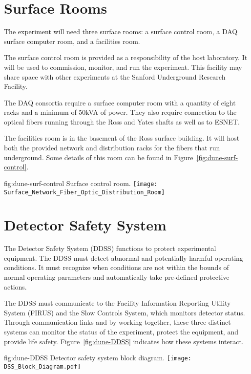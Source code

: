 \section{Surface Rooms}
\label{sec:fdsp-coord-surf-rooms}


The  experiment will need three surface rooms: a surface
control room, a DAQ surface computer room, and a facilities room.


The  surface control room is provided as a responsibility of the host laboratory.  It will be used to commission, monitor, and run the
experiment.  This facility may share space with
other experiments at the Sanford Underground Research
Facility.


The DAQ consortia require a surface computer room with a
quantity of eight racks and a minimum of 50kVA of power.  They also require connection
to the optical fibers running through the Ross and Yates shafts as
well as to ESNET.


The facilities room is in the basement of the Ross surface
building.  It will host both the \fnal provided network and
distribution racks for the fibers that run underground. Some details
of this room can be found in Figure~\ref{fig:dune-surf-control}.
\begin{dunefigure}{fig:dune-surf-control}
  {Surface control room.}
  \texttt{[image: Surface\_Network\_Fiber\_Optic\_Distribution\_Room]}
\end{dunefigure}


\section{ Detector Safety System}
\label{sec:fdsp-coord-det-safety}


The  Detector Safety System (DDSS) functions to protect
experimental equipment.  The DDSS must detect abnormal and
potentially harmful operating conditions.  It must recognize when
conditions are not within the bounds of normal operating parameters
and automatically take pre-defined protective actions.


The DDSS must communicate to the \surf Facility Information
Reporting Utility System (FIRUS) and the  Slow Controls
System, which monitors detector status.  Through communication
links and by working together, these three distinct systems can monitor the status of the experiment, protect the equipment,
and provide life safety. Figure~\ref{fig:dune-DDSS} indicates how
these systems interact.
\begin{dunefigure}{fig:dune-DDSS}
  {Detector safety system block diagram.}
  \texttt{[image: DSS\_Block\_Diagram.pdf]}
\end{dunefigure}


